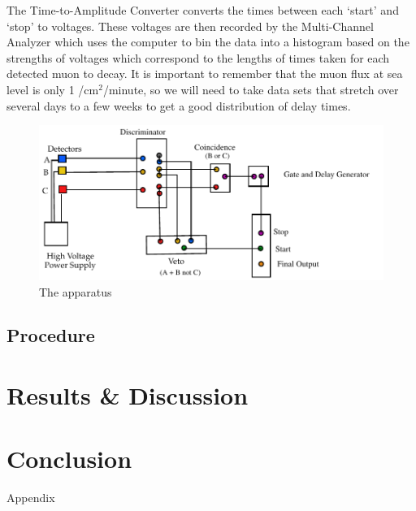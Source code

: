 \newline \indent The Time-to-Amplitude Converter converts the times between each `start' and `stop'  to voltages. These voltages are then recorded by the Multi-Channel Analyzer which uses the computer to bin the data into a histogram based on the strengths of voltages which correspond to the lengths of times taken for each detected muon to decay. It is important to remember that the muon flux at sea level is only 1 /cm$^2$/minute, so we will need to take data sets that stretch over several days to a few weeks to get a good distribution of delay times. 


\begin{figure}[H]
\begin{center}
\includegraphics[width=6 in]{ML-figure1.pdf}
\caption{The apparatus}
\end{center}
\end{figure}

\subsection{Procedure}


\section{Results \& Discussion}

\section{Conclusion}
%

\begin{thebibliography}{99}
\end{thebibliography}

\newpage \LARGE{Appendix}

  
